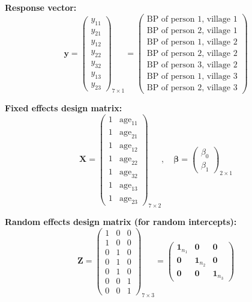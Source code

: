 \documentclass{article}
\begin{document}
\textbf{Response vector:}
\begin{equation}
\mathbf{y} = \begin{pmatrix}
y_{11} \\ y_{21} \\ \hline
y_{12} \\ y_{22} \\ y_{32} \\ \hline
y_{13} \\ y_{23}
\end{pmatrix}_{7 \times 1}
= \begin{pmatrix}
\text{BP of person 1, village 1} \\
\text{BP of person 2, village 1} \\
\hline
\text{BP of person 1, village 2} \\
\text{BP of person 2, village 2} \\
\text{BP of person 3, village 2} \\
\hline
\text{BP of person 1, village 3} \\
\text{BP of person 2, village 3}
\end{pmatrix}
\end{equation}

\textbf{Fixed effects design matrix:}
\begin{equation}
\mathbf{X} = \begin{pmatrix}
1 & \text{age}_{11} \\
1 & \text{age}_{21} \\
\hline
1 & \text{age}_{12} \\
1 & \text{age}_{22} \\
1 & \text{age}_{32} \\
\hline
1 & \text{age}_{13} \\
1 & \text{age}_{23}
\end{pmatrix}_{7 \times 2}
, \quad
\boldsymbol{\beta} = \begin{pmatrix}
\beta_0 \\ \beta_1
\end{pmatrix}_{2 \times 1}
\end{equation}

\textbf{Random effects design matrix (for random intercepts):}
\begin{equation}
\mathbf{Z} = \begin{pmatrix}
1 & 0 & 0 \\
1 & 0 & 0 \\
\hline
0 & 1 & 0 \\
0 & 1 & 0 \\
0 & 1 & 0 \\
\hline
0 & 0 & 1 \\
0 & 0 & 1
\end{pmatrix}_{7 \times 3}
= \begin{pmatrix}
\mathbf{1}_{n_1} & \mathbf{0} & \mathbf{0} \\
\mathbf{0} & \mathbf{1}_{n_2} & \mathbf{0} \\
\mathbf{0} & \mathbf{0} & \mathbf{1}_{n_3}
\end{pmatrix}
\end{equation}
\end{document}
